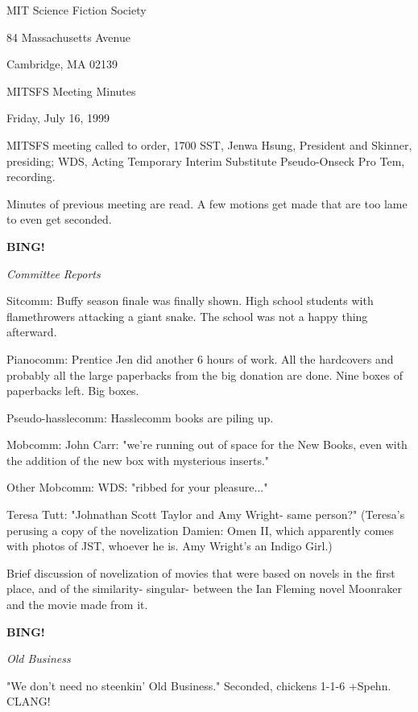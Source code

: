 \documentclass[12pt]{article}
\newcommand{\bing}{{\bf BING!} }
\newcommand{\goto}[1]{\bing \vskip 12pt \centerline{{\em{#1}}}}
\begin{document}
\begin{center}

MIT Science Fiction Society 

84 Massachusetts Avenue

Cambridge, MA 02139

\vspace{12pt}

MITSFS Meeting Minutes 

Friday, July 16, 1999

\end{center}
 
\vspace{18pt}

\setlength{\parskip}{6pt}

\noindent
MITSFS meeting called to order, 1700 SST,
Jenwa Hsung, President and Skinner, presiding; WDS, Acting Temporary Interim Substitute Pseudo-Onseck Pro Tem, recording.

Minutes of previous meeting are read. A few motions get made that are too lame to even get seconded.

\goto{Committee Reports}

Sitcomm: Buffy season finale was finally shown. High school students with flamethrowers attacking a giant snake. The school was not a happy thing afterward.

Pianocomm: Prentice Jen did another 6 hours of work. All the hardcovers and probably all the large paperbacks from the big donation are done. Nine boxes of paperbacks left. Big boxes.

Pseudo-hasslecomm: Hasslecomm books are piling up.

Mobcomm: John Carr: "we're running out of space for the New Books, even with the addition of the new box with mysterious inserts."

Other Mobcomm: WDS: "ribbed for your pleasure..."

Teresa Tutt: "Johnathan Scott Taylor and Amy Wright- same person?" (Teresa's perusing a copy of the novelization Damien: Omen II, which apparently comes with photos of JST, whoever he is. Amy Wright's an Indigo Girl.)

Brief discussion of novelization of movies that were based on novels in the first place, and of the similarity- singular- between the Ian Fleming novel Moonraker and the movie made from it.

\goto{Old Business}

"We don't need no steenkin' Old Business." Seconded, chickens 1-1-6 +Spehn. CLANG!
\end{document}
